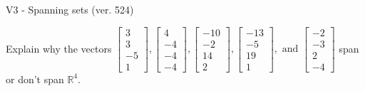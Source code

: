 \begin{exercise}
  \begin{exerciseTitle}V3 - Spanning sets (ver. 524)\end{exerciseTitle}
  \begin{exerciseStatement}
    Explain why the vectors \(\left[\begin{array}{r}
3 \\
3 \\
-5 \\
1
\end{array}\right] , \left[\begin{array}{r}
4 \\
-4 \\
-4 \\
-4
\end{array}\right] , \left[\begin{array}{r}
-10 \\
-2 \\
14 \\
2
\end{array}\right] , \left[\begin{array}{r}
-13 \\
-5 \\
19 \\
1
\end{array}\right] , \text{ and } \left[\begin{array}{r}
-2 \\
-3 \\
2 \\
-4
\end{array}\right]\) span or don't span \(\mathbb{R}^4\). 
	



\end{exerciseStatement}
\end{exercise}
